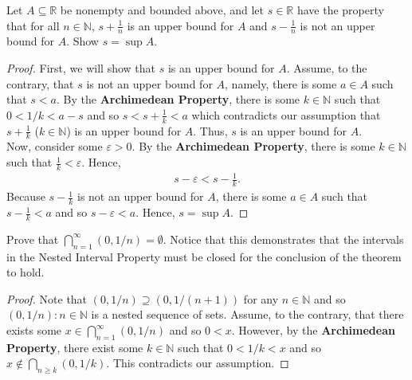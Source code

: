 \documentclass[12pt]{article}
\newcommand{\N}{\mathbb{N}}
\newcommand{\R}{\mathbb{R}}
\newenvironment{problem}[2][Problem]{\begin{trivlist}
		\item[\hskip \labelsep {\bfseries #1}\hskip \labelsep {\bfseries #2.}]}{\end{trivlist}}
\begin{document}
	\begin{problem}{1.4.2}
		Let $A\subseteq \R$ be nonempty and bounded above, and let $s\in \R$ have the property that for all $n\in \N$, $s+\frac{1}{n}$ is an upper bound for $A$ and $s-\frac{1}{n}$ is not an upper bound for $A$. Show $s=\sup A$.
		\begin{proof}
			First, we will show that $s$ is an upper bound for $A$. Assume, to the contrary, that $s$ is not an upper bound for $A$, namely, there is some $a\in A$ such that $s<a$. By the \textbf{Archimedean Property}, there is some $k\in \N$ such that $0<1/k < a-s$ and so $s<s+\frac{1}{k} <a$ which contradicts our assumption that $s+\frac{1}{k}$ ($k\in \N$) is an upper bound for $A$. Thus, $s$ is an upper bound for $A$.\\
			
			Now, consider some $\varepsilon > 0$. By the \textbf{Archimedean Property}, there is some $k\in \N$ such that $\frac{1}{k} < \varepsilon$. Hence,
			\begin{align*}
				s-\varepsilon < s-\frac{1}{k}.
			\end{align*}
		Because $s-\frac{1}{k}$ is not an upper bound for $A$, there is some $a\in A$ such that $s-\frac{1}{k} < a$ and so $s-\varepsilon < a$. Hence, $s=\sup A$.
		\end{proof}
	\end{problem}

	\begin{problem}{1.4.3}
		Prove that $\bigcap^{\infty}_{n=1} (0,1/n)=\emptyset$. Notice that this demonstrates that the intervals in the Nested Interval Property must be closed for the conclusion of the theorem to hold.
		\begin{proof}
			Note that $(0,1/n) \supseteq (0,1/(n+1))$ for any $n\in \N$ and so ${(0,1/n):n\in \N}$ is a nested sequence of sets. Assume, to the contrary, that there exists some $x\in \bigcap^{\infty}_{n=1} (0,1/n)$ and so $0<x$. However, by the \textbf{Archimedean Property}, there exist some $k\in \N$ such that $0<1/k<x$ and so $x\not\in \bigcap_{n\geq k} (0,1/k)$. This contradicts our assumption.
 		\end{proof}
	\end{problem}
\end{document}
